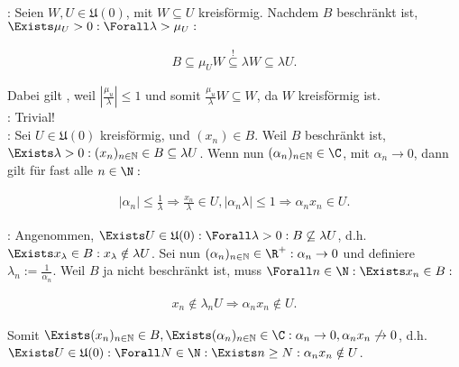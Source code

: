 \begin{solution}

:
Seien $W, U \in \mathfrak{U}(0)$, mit $W \subseteq U$ kreisförmig.
Nachdem $B$ beschränkt ist, $\Exists \mu_U > 0: \Forall \lambda > \mu_U:$

\begin{align*}
  B
  \subseteq
  \mu_U W
  \stackrel{!}{\subseteq}
  \lambda W
  \subseteq
  \lambda U.
\end{align*}

Dabei gilt \Quote{!}, weil $|\frac{\mu_u}{\lambda}| \leq 1$ und somit $\frac{\mu_u}{\lambda} W \subseteq W$, da $W$ kreisförmig ist. \\

:
Trivial! \\

:
Sei $U \in \mathfrak{U}(0)$ kreisförmig, und $(x_n) \in B$.
Weil $B$ beschränkt ist, $\Exists \lambda > 0: (x_n)_{n\in\mathbb{N}} \in B \subseteq \lambda U$.
Wenn nun $(\alpha_n)_{n\in\mathbb{N}} \in \C$, mit $\alpha_n \to 0$, dann gilt für fast alle $n \in \N:$

\begin{align*}
  |\alpha_n| \leq \frac{1}{\lambda}
  \Rightarrow
  \frac{x_n}{\lambda} \in U,
  |\alpha_n \lambda| \leq 1
  \Rightarrow
  \alpha_n x_n \in U.
\end{align*}

:
Angenommen, $\Exists U \in \mathfrak{U}(0): \Forall \lambda > 0: B \not \subseteq \lambda U$, d.h. $\Exists x_\lambda \in B: x_\lambda \notin \lambda U$.
Sei nun $(\alpha_n)_{n\in\mathbb{N}} \in \R^+: \alpha_n \to 0$ und definiere $\lambda_n := \frac{1}{\alpha_n}$.
Weil $B$ ja nicht beschränkt ist, muss $\Forall n \in \N: \Exists x_n \in B:$

\begin{align*}
  x_n \notin \lambda_n U
  \Rightarrow
  \alpha_n x_n \notin U.
\end{align*}

Somit $\Exists (x_n)_{n\in\mathbb{N}} \in B, \Exists (\alpha_n)_{n\in\mathbb{N}} \in \C: \alpha_n \to 0, \alpha_n x_n \not \to 0$, d.h. $\Exists U \in \mathfrak{U}(0): \Forall N \in \N: \Exists n \geq N: \alpha_n x_n \notin U$.

\end{solution}
